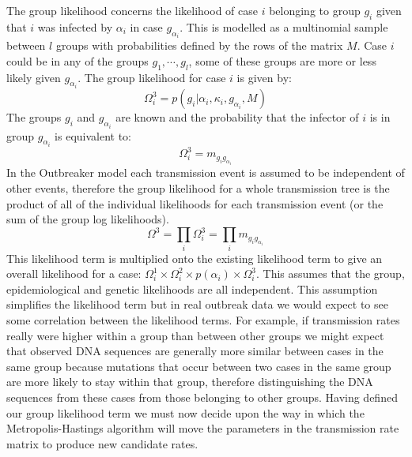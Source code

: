 \documentclass[11pt,a4paper]{report}
\begin{document}
The group likelihood concerns the likelihood of case $i$ belonging to group $g_i$ given that $i$ was infected by $\alpha_i$ in case $g_{\alpha_i}$. This is modelled as a multinomial sample between $l$ groups with probabilities defined by the rows of the matrix $M$. Case $i$ could be in any of the groups $g_1,\cdots,g_l$, some of these groups are more or less likely given $g_{\alpha_i}$. The group likelihood for case $i$ is given by:
\begin{equation}
\Omega_i^3 = p(g_i | \alpha_i, \kappa_i, g_{\alpha_i}, M)
\end{equation}
The groups $g_i$ and $g_{\alpha_i}$ are known and the probability that the infector of $i$ is in group $g_{\alpha_i}$ is equivalent to:
\begin{equation}
\Omega_i^3 = m_{g_i g_{\alpha_i}}
\end{equation}
In the Outbreaker model each transmission event is assumed to be independent of other events, therefore the group likelihood for a whole transmission tree is the product of all of the individual likelihoods for each transmission event (or the sum of the group log likelihoods).
\[ \Omega^3 = \prod_i{\Omega_i^3} = \prod_i{m_{g_i g_{\alpha_i}}} \]
This likelihood term is multiplied onto the existing likelihood term to give an overall likelihood for a case: $\Omega_i^1 \times \Omega_i^2 \times p(\alpha_i) \times \Omega_i^3$. This assumes that the group, epidemiological and genetic likelihoods are all independent. This assumption simplifies the likelihood term but in real outbreak data we would expect to see some correlation between the likelihood terms. For example, if transmission rates really were higher within a group than between other groups we might expect that observed DNA sequences are generally more similar between cases in the same group because mutations that occur between two cases in the same group are more likely to stay within that group, therefore distinguishing the DNA sequences from these cases from those belonging to other groups. Having defined our group likelihood term we must now decide upon the way in which the Metropolis-Hastings algorithm will move the parameters in the transmission rate matrix to produce new candidate rates.
\end{document}

